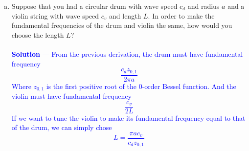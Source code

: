 \documentclass[12pt]{article}
\begin{document}
\begin{enumerate}[(a)]
{With solution
\begin{align*}
T_n(t) = A_n \cos \left( \frac{n \pi c t}{L} \right) + B_n \sin \left( \frac{n \pi c t}{L} \right)
\end{align*}
Hence the string's frequencies are
\begin{align*}
f_n = \frac{nc}{2L}
\end{align*}
The smallest and most fundamental of which comes from $n=1$: 
$$\boxed{f = \frac{c}{2L}}$$
}
\item Suppose that you had a circular drum with wave speed $c_d$ and radius $a$ and a violin string with wave speed $c_v$ and length $L$. 
In order to make the fundamental frequencies of the drum and violin the same, how would you choose the length $L$? \\ \\ \textcolor{blue}{\textbf{Solution} — From the previous derivation, the drum must have fundamental frequency 
$$\frac{c_dz_{0,1}}{2 \pi a}$$
Where $z_{0,1}$ is the first positive root of the 0-order Bessel function. And the violin must have fundamental frequency
$$\frac{c_v}{2L}$$
If we want to tune the violin to make its fundamental frequency equal to that of the drum, we can simply chose $$\boxed{L = \frac{\pi a c_v}{c_d z_{0,1}}}$$
}
\end{enumerate}


\vspace{0.3in}
\end{document}
